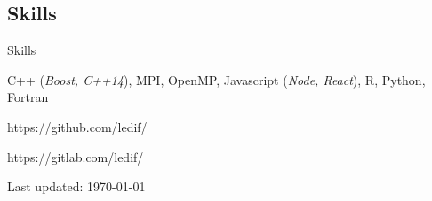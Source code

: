\documentclass[a4paper,10pt,oneside]{article}
\begin{document}
\begin{body}





\section{Skills}
{Skills}

C++ (\emph{Boost, C++14}), MPI, OpenMP, Javascript (\emph{Node, React}), R, Python, Fortran
\par
\EntryGap
https://github.com/ledif/
\par
\EntryGap
https://gitlab.com/ledif/





\EntryGap
\EntryGap
\EntryGap

  \begin{small}
    Last updated: \today
  \end{small}


\end{body}
\end{document}
